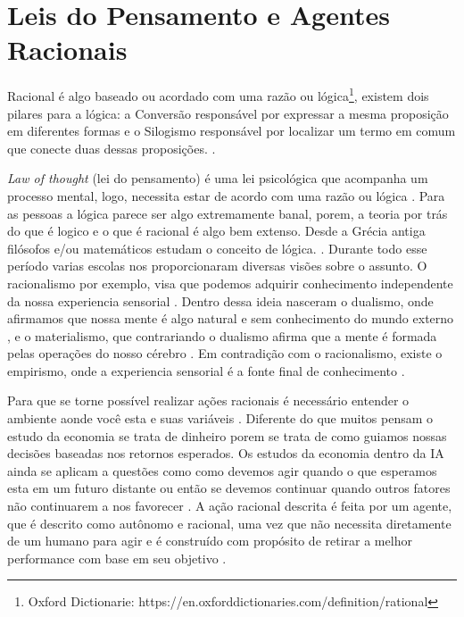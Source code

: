 \section{Leis do Pensamento e Agentes Racionais}

Racional é algo baseado ou acordado com uma razão ou lógica\footnote{Oxford Dictionarie:  https://en.oxforddictionaries.com/definition/rational}, existem dois pilares para a lógica: a Conversão responsável por expressar a mesma proposição em diferentes formas e o Silogismo responsável por localizar um termo em comum que conecte duas dessas proposições. \cite[175]{boole1854investigation}.

\textit{Law of thought} (lei do pensamento) é uma lei psicológica que acompanha um processo mental, logo, necessita estar de acordo com uma razão ou lógica \cite[289-291]{frege1956thought}. Para as pessoas a lógica parece ser algo extremamente banal, porem, a teoria por trás do que é logico e o que é racional é algo bem extenso. Desde a Grécia antiga filósofos e/ou matemáticos estudam o conceito de lógica. \cite[4-5]{russell2003artificial}. Durante todo esse período varias escolas nos proporcionaram diversas visões sobre o assunto. O racionalismo por exemplo, visa que podemos adquirir conhecimento independente da nossa experiencia sensorial \cite{rationalismvsempiricism}. Dentro dessa ideia nasceram o dualismo, onde afirmamos que nossa mente é algo natural e sem conhecimento do mundo externo \cite[7]{descartes2013rene}, e o materialismo, que contrariando o dualismo afirma que a mente é formada pelas operações do nosso cérebro \cite[6]{russell2003artificial}.
Em contradição com o racionalismo, existe o empirismo, onde a experiencia sensorial é a fonte final de conhecimento \cite{rationalismvsempiricism}.


Para que se torne possível realizar ações racionais é necessário entender o ambiente aonde você esta e suas variáveis \cite[99]{simon1955behavioral}. Diferente do que muitos pensam o estudo da economia se trata de dinheiro porem se trata de como guiamos nossas decisões baseadas nos retornos esperados. Os estudos da economia dentro da IA ainda se aplicam a questões como como devemos agir quando o que esperamos esta em um futuro distante ou então se devemos continuar quando outros fatores não continuarem a nos favorecer \cite[9]{russell2003artificial}. A ação racional descrita é feita por um agente, que é descrito como autônomo e racional, uma vez que não necessita diretamente de um humano para agir e é construído com propósito de retirar a melhor performance com base em seu objetivo \cite[2]{ wooldridge1994agent}.

